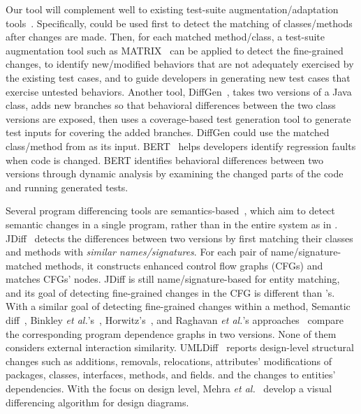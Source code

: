 \vspace{0.05in}
 Our tool will
complement well to existing test-suite augmentation/adaptation
tools~\cite{orso08,bert10,diffgen08}. Specifically, {\tool} could be
used first to detect the matching of classes/methods after changes are
made. Then, for each matched method/class, a test-suite augmentation
tool such as MATRIX~\cite{orso08} can be applied to detect the
fine-grained changes, to identify new/modified behaviors that are not
adequately exercised by the existing test cases, and to guide
developers in generating new test cases that exercise untested
behaviors. Another tool, DiffGen~\cite{diffgen08}, takes two versions
of a Java class, adds new branches so that behavioral differences
between the two class versions are exposed, then uses a coverage-based
test generation tool to generate test inputs for covering the added
branches. DiffGen could use the matched class/method from {\tool} as
its input.  BERT~\cite{bert10} helps developers identify regression
faults when code is changed. BERT identifies behavioral differences
between two versions through dynamic analysis by examining the changed
parts of the code and running generated tests.

\vspace{0.04in}
  Several program differencing
tools are
semantics-based~\cite{Apiwattanapong04,Horwitz1990,Jackson1994}, which
aim to detect semantic changes in a single program, rather than in
the entire system as in {\tool}. JDiff~\cite{Apiwattanapong04} detects the
differences between two versions by first matching their classes and
methods with {\em similar names/signatures}. For each pair of
name/signature-matched methods, it constructs enhanced control flow
graphs (CFGs) and matches CFGs' nodes.
JDiff is still name/signature-based for entity matching, and its goal
of detecting fine-grained changes in the CFG is different than
{\tool}'s. With a similar goal of detecting fine-grained changes
within a method, Semantic diff~\cite{Jackson1994},
Binkley {\em et al.}'s~\cite{Binkley1995},
Horwitz's~\cite{Horwitz1990}, and Raghavan {\em et al.}'s
approaches~\cite{Raghavan04} compare the corresponding program
dependence graphs in two versions. None of them considers external
interaction similarity.
UMLDiff~\cite{xing05} reports design-level structural changes such as
additions, removals, relocations, attributes' modifications of
packages, classes, interfaces, methods, and fields.
and the changes to entities' dependencies.
With the focus on design level, Mehra {\em et al.}~\cite{grundy05}
develop a visual differencing algorithm for design diagrams.

